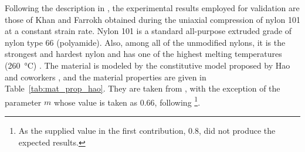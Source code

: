 Following the description in \cite{haoUnifiedAmorphousCrystalline2022}, the experimental results employed for validation are those of Khan and Farrokh \citep{khanThermomechanicalResponseNylon2006} obtained during the uniaxial compression of nylon 101 at a constant strain rate.
Nylon 101 is a standard all-purpose extruded grade of nylon type 66 (polyamide).
Also, among all of the unmodified nylons, it is the strongest and hardest nylon and has one of the highest melting temperatures (\SI{260}{\celsius}) \citep{khanThermomechanicalResponseNylon2006}.
The material is modeled by the constitutive model proposed by Hao and coworkers \citep{haoUnifiedAmorphousCrystalline2022}, and the material properties are given in Table~\ref{tab:mat_prop_hao}.
They are taken from \cite{haoUnifiedAmorphousCrystalline2022}, with the exception of the parameter $m$ whose value is taken as \num{0.66}, following \cite{haoRatedependentConstitutiveModel2022} \footnote{As the supplied value in the first contribution, \num{0.8}, did not produce the expected results.}.
%
